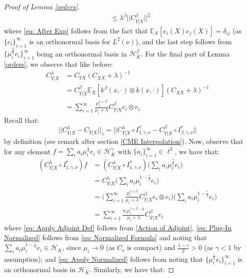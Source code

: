 \documentclass[accepted]{article}
\theoremstyle{definition}
\begin{document}
\begin{proof}[Proof of Lemma \ref{orders}]
\begin{align}
    & \leq \lambda^{\beta} ||C^{\beta}_{Y|X}||^2
\end{align}
where \eqref{eq: After Exp} follows from the fact that $\mathbb{E}_{X}[e_i(X)e_j(X)] = \delta_{ij}$ (as $\{e_i\}_{i = 1}^{\infty}$ is an orthonormal basis for $L^2(\nu)$), and the last step follows from $\{\mu_i^{\frac{\beta}{2}}e_i\}_{i = 1}^{\infty}$ being an orthonormal basis in $\mathcal{H}_{K}^{\beta}$. For the final part of Lemma \ref{orders}, we observe that like before:
\begin{align}
    C^{\lambda}_{Y|X} & = C_{YX}(C_{XX} + \lambda)^{-1} \nonumber \\
    & = C^{\beta}_{Y|X}\mathbb{E}_{X}[k^{\beta}(x, \cdot) \otimes k(x, \cdot)](C_{XX} + \lambda)^{-1} \nonumber \\
    & = \sum_{i = 1}^{\infty} \frac{\mu_i^{1 + \beta}}{\mu_i + \lambda} C^{\beta}_{Y|X} e_i \otimes e_i \label{eq: Normalized Formula}
\end{align}
Recall that:
\begin{equation*}
    ||C^{\lambda}_{Y|X} - C_{Y|X}||_{\gamma} = ||C^{\lambda}_{Y|X} \circ I^{*}_{1, \gamma, \nu} - C^{\beta}_{Y|X} \circ I^{*}_{\beta, \gamma, \nu}|| 
\end{equation*}
by definition (see remark after section \ref{CME Interpolation}). Now, observe that for any element $f = \sum_{i} a_i \mu^{\frac{\gamma}{2}}_i e_i \in \mathcal{H}^{\gamma}_K$ with $\{a_i\}_{i = 1}^{\infty} \in \ell^2$, we have that:
\begin{align}
    (C^{\lambda}_{Y|X} \circ I^{*}_{1, \gamma, \nu})f & = (C^{\lambda}_{Y|X} \circ I^{*}_{1, \gamma, \nu}) \Big(\sum_{i} a_i \mu^{\frac{\gamma}{2}}_i e_i\Big) \nonumber \\
    & = C^{\lambda}_{Y|X} \Big(\sum_{i} a_i \mu^{1 - \frac{\gamma}{2}}_i e_i\Big) \label{eq: Apply Adjoint Def} \\
    & = \Big(\sum_{i = 1}^{\infty} \frac{\mu_i^{1 + \beta}}{\mu_i + \lambda} C^{\beta}_{Y|X} e_i \otimes e_i\Big) \Big(\sum_{i} a_i \mu^{1 - \frac{\gamma}{2}}_i e_i\Big) \label{eq: Plug-In Normalized}\\
    & = \sum_{i = 1}^{\infty} \frac{a_i\mu_i^{1 + \beta -\frac{\gamma}{2}}}{\mu_i + \lambda} C^{\beta}_{Y|X} e_i  \label{eq: Apply Normalized}
\end{align}
where \eqref{eq: Apply Adjoint Def} follows from \eqref{Action of Adjoint}, \eqref{eq: Plug-In Normalized} follows from \eqref{eq: Normalized Formula} and noting that $\sum_{i} a_i \mu_i^{1 - \frac{\gamma}{2}} e_i \in \mathcal{H}_{K}$, since $\mu_i \to 0$ (as $C_{\nu}$ is compact) and $\frac{1 - \gamma}{2} > 0$ (as $\gamma < 1$ by assumption); and \eqref{eq: Apply Normalized} follows from noting that $\{\mu^{\frac{1}{2}}_i e_i\}_{i = 1}^{\infty}$ is an orthonormal basis in $\mathcal{H}_K$. Similarly, we have that:

\end{proof}
\end{document}
